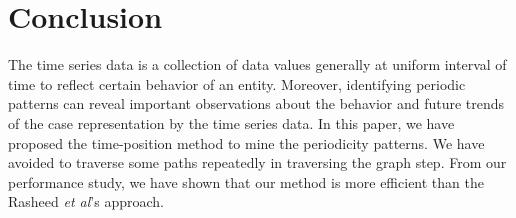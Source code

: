 %
%
%
\chapter{Conclusion}
\vspace*{30pt}

The time series data is a collection of data values generally at
uniform interval of time to reflect certain behavior of an entity.
Moreover, identifying periodic patterns can reveal important
observations about the behavior and future trends of the case
representation by the time series data. In this paper, we have
proposed the time-position method to mine the periodicity patterns.
We have avoided to traverse some paths repeatedly in traversing the
graph step. From our performance study, we have shown that our
method is more efficient than the Rasheed \emph{et al}'s approach.

